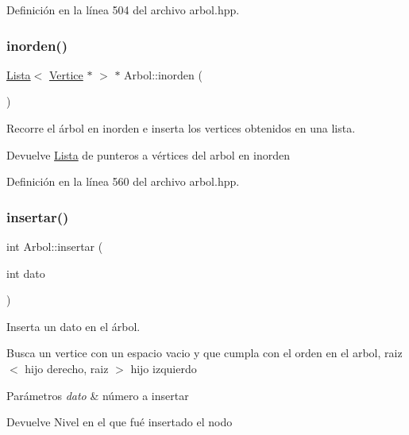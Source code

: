 Definición en la línea 504 del archivo arbol.\+hpp.

\mbox{\label{classArbol_a80a0c3cf2d7f3e92a5c8e5504947dab5}} 
\subsubsection{\texorpdfstring{inorden()}{inorden()}}
{\footnotesize\ttfamily \hyperlink{classLista}{Lista}$<$ \hyperlink{classVertice}{Vertice} $\ast$ $>$ $\ast$ Arbol\+::inorden (\begin{DoxyParamCaption}{ }\end{DoxyParamCaption})}



Recorre el árbol en inorden e inserta los vertices obtenidos en una lista. 

\begin{DoxyReturn}{Devuelve}
\hyperlink{classLista}{Lista} de punteros a vértices del arbol en inorden 
\end{DoxyReturn}


Definición en la línea 560 del archivo arbol.\+hpp.

\mbox{\label{classArbol_af332559b5f9d894ecc6a707bb1550ae2}} 
\subsubsection{\texorpdfstring{insertar()}{insertar()}}
{\footnotesize\ttfamily int Arbol\+::insertar (\begin{DoxyParamCaption}\item[{int}]{dato }\end{DoxyParamCaption})}



Inserta un dato en el árbol. 

Busca un vertice con un espacio vacio y que cumpla con el orden en el arbol, raiz $<$ hijo derecho, raiz $>$ hijo izquierdo


\begin{DoxyParams}{Parámetros}
{\em dato} & número a insertar \\
\hline
\end{DoxyParams}
\begin{DoxyReturn}{Devuelve}
Nivel en el que fué insertado el nodo 
\end{DoxyReturn}


